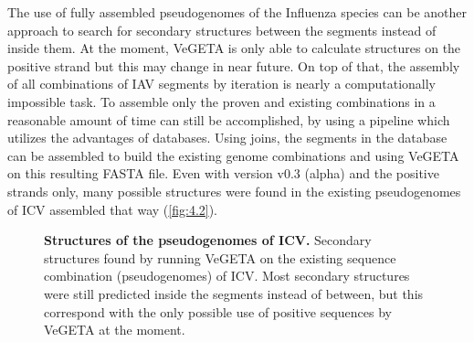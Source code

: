    The use of fully assembled pseudogenomes of the Influenza species can be another approach to search for secondary structures between the segments instead of inside them. At the moment, VeGETA is only able to calculate structures on the positive strand but this may change in near future. On top of that, the assembly of all combinations of \gls{IAV} segments by iteration is nearly a computationally impossible task. To assemble only the proven and existing combinations in a reasonable amount of time can still be accomplished, by using a pipeline which utilizes the advantages of databases. Using joins, the segments in the database can be assembled to build the existing genome combinations and using VeGETA on this resulting FASTA file. Even with version v0.3 (alpha) and the positive strands only, many possible structures were found in the existing pseudogenomes of \gls{ICV} assembled that way (\autoref{fig:4.2}).
    
    \begin{figure}[!htb]
        \centering
        \caption[Structures of the pseudogenomes of \gls{ICV}]{\textbf{Structures of the pseudogenomes of \gls{ICV}.} Secondary structures found by running VeGETA on the existing sequence combination (pseudogenomes) of \gls{ICV}. Most secondary structures were still predicted inside the segments instead of between, but this correspond with the only possible use of positive sequences by VeGETA at the moment.}
        \label{fig:4.2}
    \end{figure}
    
